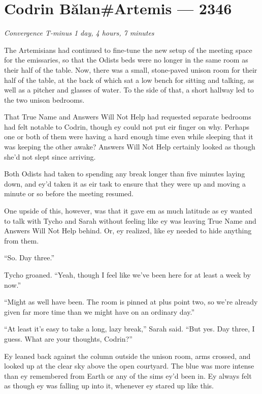 \hypertarget{codrin-bux103lanartemis-2346}{%
\chapter{Codrin Bălan\#Artemis — 2346}\label{codrin-bux103lanartemis-2346}}

\begin{center}
\emph{Convergence T-minus 1 day, 4 hours, 7 minutes}
\end{center}

\noindent The Artemisians had continued to fine-tune the new setup of the meeting space for the emissaries, so that the Odists beds were no longer in the same room as their half of the table. Now, there was a small, stone-paved unison room for their half of the table, at the back of which sat a low bench for sitting and talking, as well as a pitcher and glasses of water. To the side of that, a short hallway led to the two unison bedrooms.

That True Name and Answers Will Not Help had requested separate bedrooms had felt notable to Codrin, though ey could not put eir finger on why. Perhaps one or both of them were having a hard enough time even while sleeping that it was keeping the other awake? Answers Will Not Help certainly looked as though she'd not slept since arriving.

Both Odists had taken to spending any break longer than five minutes laying down, and ey'd taken it as eir task to ensure that they were up and moving a minute or so before the meeting resumed.

One upside of this, however, was that it gave em as much latitude as ey wanted to talk with Tycho and Sarah without feeling like ey was leaving True Name and Answers Will Not Help behind. Or, ey realized, like ey needed to hide anything from them.

``So. Day three.''

Tycho groaned. ``Yeah, though I feel like we've been here for at least a week by now.''

``Might as well have been. The room is pinned at plus point two, so we're already given far more time than we might have on an ordinary day.''

``At least it's easy to take a long, lazy break,'' Sarah said. ``But yes. Day three, I guess. What are your thoughts, Codrin?''

Ey leaned back against the column outside the unison room, arms crossed, and looked up at the clear sky above the open courtyard. The blue was more intense than ey remembered from Earth or any of the sims ey'd been in. Ey always felt as though ey was falling up into it, whenever ey stared up like this.

